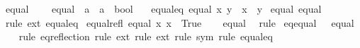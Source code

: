 \begin{isabellebody}
\endisatagML
{\isafoldML}%
%
\isadelimML
%
\endisadelimML
%
\isadelimdocument
%
\endisadelimdocument
%
\isatagdocument
%
\isamarkuptrue%
%
\endisatagdocument
{\isafolddocument}%
%
\isadelimdocument
%
\endisadelimdocument
{}\isamarkupfalse%
\ equal\ {\isacharequal}{\kern0pt}\isanewline
\ \ \ equal\ {\isacharcolon}{\kern0pt}{\isacharcolon}{\kern0pt}\ {\isachardoublequoteopen}{\isacharprime}{\kern0pt}a\ {\isasymRightarrow}\ {\isacharprime}{\kern0pt}a\ {\isasymRightarrow}\ bool{\isachardoublequoteclose}\isanewline
\ \ \ equal{\isacharunderscore}{\kern0pt}eq{\isacharcolon}{\kern0pt}\ {\isachardoublequoteopen}equal\ x\ y\ {\isasymlongleftrightarrow}\ x\ {\isacharequal}{\kern0pt}\ y{\isachardoublequoteclose}\isanewline
{}\isanewline
\isanewline
{}\isamarkupfalse%
\ equal{\isacharcolon}{\kern0pt}\ {\isachardoublequoteopen}equal\ {\isacharequal}{\kern0pt}\ {\isacharparenleft}{\kern0pt}{\isacharequal}{\kern0pt}{\isacharparenright}{\kern0pt}{\isachardoublequoteclose}\isanewline
%
\isadelimproof
\ \ %
\endisadelimproof
%
\isatagproof
{}\isamarkupfalse%
\ {\isacharparenleft}{\kern0pt}rule\ ext\ equal{\isacharunderscore}{\kern0pt}eq{\isacharparenright}{\kern0pt}{\isacharplus}{\kern0pt}%
\endisatagproof
{\isafoldproof}%
%
\isadelimproof
\isanewline
%
\endisadelimproof
\isanewline
{}\isamarkupfalse%
\ equal{\isacharunderscore}{\kern0pt}refl{\isacharcolon}{\kern0pt}\ {\isachardoublequoteopen}equal\ x\ x\ {\isasymlongleftrightarrow}\ True{\isachardoublequoteclose}\isanewline
%
\isadelimproof
\ \ %
\endisadelimproof
%
\isatagproof
{}\isamarkupfalse%
\ equal\ \isamarkupfalse%
\ rule{\isacharplus}{\kern0pt}%
\endisatagproof
{\isafoldproof}%
%
\isadelimproof
\isanewline
%
\endisadelimproof
\isanewline
{}\isamarkupfalse%
\ eq{\isacharunderscore}{\kern0pt}equal{\isacharcolon}{\kern0pt}\ {\isachardoublequoteopen}{\isacharparenleft}{\kern0pt}{\isacharequal}{\kern0pt}{\isacharparenright}{\kern0pt}\ {\isasymequiv}\ equal{\isachardoublequoteclose}\isanewline
%
\isadelimproof
\ \ %
\endisadelimproof
%
\isatagproof
{}\isamarkupfalse%
\ {\isacharparenleft}{\kern0pt}rule\ eq{\isacharunderscore}{\kern0pt}reflection{\isacharparenright}{\kern0pt}\ {\isacharparenleft}{\kern0pt}rule\ ext{\isacharcomma}{\kern0pt}\ rule\ ext{\isacharcomma}{\kern0pt}\ rule\ sym{\isacharcomma}{\kern0pt}\ rule\ equal{\isacharunderscore}{\kern0pt}eq{\isacharparenright}{\kern0pt}%
\endisatagproof
{\isafoldproof}%

\end{isabellebody}
